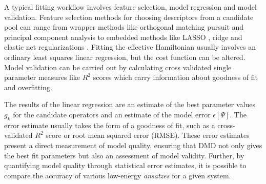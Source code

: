 \documentclass[12pt]{article}
\begin{document}
A typical fitting workflow involves feature selection, model regression and model validation.
Feature selection methods for choosing descriptors from a candidate pool can range from wrapper methods like orthogonal matching pursuit \cite{Cai2011} and principal component analysis \cite{pearson_karl_1901_1430636} to embedded methods like LASSO \cite{10.2307/2346178}, ridge \cite{doi:10.1137/S0895479897326432} and elastic net regularizations \cite{Zou05regularizationand}. 
Fitting the effective Hamiltonian usually involves an ordinary least squares linear regression, but the cost function can be altered.
Model validation can be carried out by calculating cross validated single parameter measures like $R^2$ scores which carry information about goodness of fit and overfitting.

The results of the linear regression are an estimate of the best parameter values $g_k$ for the candidate operators and an estimate of the model error $\epsilon[\Psi]$.
The error estimate usually takes the form of a goodness of fit, such as a cross-validated $R^2$ score or root mean squared error (RMSE).
These error estimates present a direct measurement of model quality, ensuring that DMD not only gives the best fit parameters but also an assessment of model validity.
Further, by quantifying model quality through statistical error estimates, it is possible to compare the accuracy of various low-energy \textit{ansatzes} for a given system.
\end{document}
